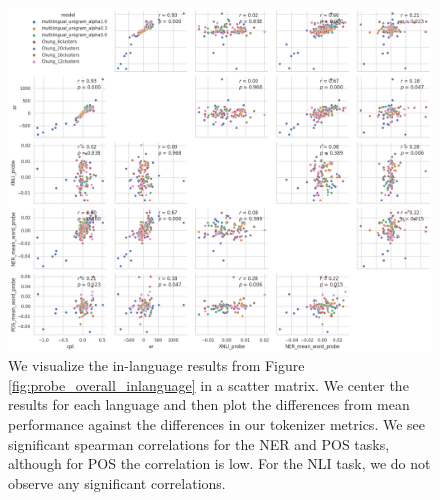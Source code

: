 \begin{figure}[H]
    \centering
    \includegraphics[width=\textwidth]{img/temp/probe_overall_inlanguage_scattermatrix.png}
    \caption{We visualize the in-language results from Figure \ref{fig:probe_overall_inlanguage} in a scatter matrix. We center the results for each language and then plot the differences from mean performance against the differences in our tokenizer metrics. We see significant spearman correlations for the NER and POS tasks, although for POS the correlation is low. For the NLI task, we do not observe any significant correlations.}
    \label{fig:probe_overall_inlanguage_scattermatrix}
\end{figure}



